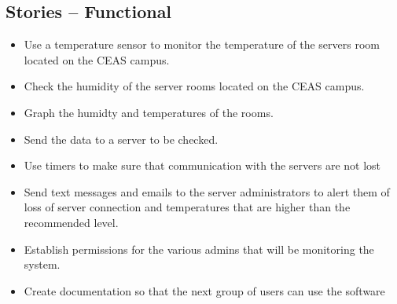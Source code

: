 \documentclass{report}
\begin{document}
\subsection*{Stories -- Functional}
\begin {itemize}
\item Use a temperature sensor to monitor the temperature of the servers room located on the CEAS campus.
\item Check the humidity of the server rooms located on the CEAS campus.
\item Graph the humidty and temperatures of the rooms.
\item Send the data to a server to be checked.
\item Use timers to make sure that communication with the servers are not lost
\item Send text messages and emails to the server administrators to alert them of loss of server connection and temperatures that are higher than the recommended level.
\item Establish permissions for the various admins that will be monitoring the system.
\item Create documentation so that the next group of users can use the software
\end {itemize}
\newpage
\end{document}
